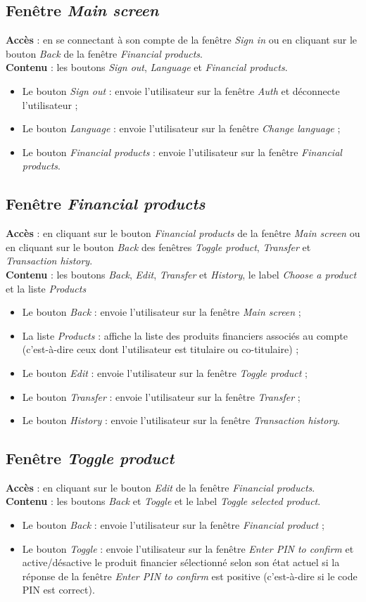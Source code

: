 \documentclass{article}
\newcommand{\navbutton}[2]{Le bouton \emph{#1} : envoie l'utilisateur sur la fenêtre \emph{#2}}
\newcommand{\access}[1]{ \noindent\textbf{Accès} : #1 \\}
\newcommand{\content}[1]{\textbf{Contenu} : #1}
\begin{document}
\subsection{Fenêtre \emph{Main screen}}
\access{en se connectant à son compte de la fenêtre \emph{Sign in} ou en cliquant sur le bouton \emph{Back} de la fenêtre \emph{Financial products}.}
\content{les boutons \emph{Sign out}, \emph{Language} et \emph{Financial products}.}
\begin{itemize}
\item \navbutton{Sign out}{Auth} et déconnecte l'utilisateur ;
\item \navbutton{Language}{Change language} ;
\item \navbutton{Financial products}{Financial products}.
\end{itemize}


\subsection{Fenêtre \emph{Financial products}}
\access{en cliquant sur le bouton \emph{Financial products} de la fenêtre \emph{Main screen} ou en cliquant sur le bouton \emph{Back} des fenêtres \emph{Toggle product}, \emph{Transfer} et \emph{Transaction history}.}
\content{les boutons \emph{Back}, \emph{Edit}, \emph{Transfer} et \emph{History}, le label \emph{Choose a product} et la liste \emph{Products}}
\begin{itemize}
\item \navbutton{Back}{Main screen} ;
\item La liste \emph{Products} : affiche la liste des produits financiers associés au compte (c'est-à-dire ceux dont l'utilisateur est titulaire ou co-titulaire) ;
\item \navbutton{Edit}{Toggle product} ;
\item \navbutton{Transfer}{Transfer} ;
\item \navbutton{History}{Transaction history}.
\end{itemize}


\subsection{Fenêtre \emph{Toggle product}}
\access{en cliquant sur le bouton \emph{Edit} de la fenêtre \emph{Financial products}.}
\content{les boutons \emph{Back} et \emph{Toggle} et le label \emph{Toggle selected product}.}
\begin{itemize}
\item \navbutton{Back}{Financial product} ;
\item \navbutton{Toggle}{Enter PIN to confirm} et active/désactive le produit financier sélectionné selon son état actuel si la réponse de la fenêtre \emph{Enter PIN to confirm} est positive (c'est-à-dire si le code PIN est correct).
\end{itemize}
\end{document}
